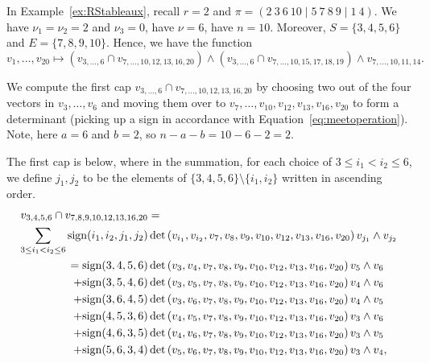 \documentclass[ALCO, Unicode]{cedram}
\numberwithin{equation}{section}
\begin{document}
\begin{example}\label{ex:cap}
In Example~\ref{ex:RStableaux}, recall $r=2$ and $\pi=(2~3~6~10 \mid 5~7~8~9 \mid 1~4)$. We have $\nu_1 = \nu_2 = 2$ and $\nu_3 = 0$, have $\nu = 6$, have $n=10$. Moreover, $S = \{3,4,5,6\}$ and $E = \{7,8,9,10\}$.
Hence, we have the function 
\[v_1,\dots,v_{20} \mapsto \left(v_{3,\dots,6} \cap v_{7,\dots,10, 12, 13, 16, 20} \right) \wedge \left(v_{3,\dots,6} \cap v_{7,\dots,10, 15, 17, 18, 19} \right) \wedge v_{7,\dots,10, 11, 14}.\]

We compute the first cap $v_{3,\dots,6} \cap v_{7,\dots,10, 12, 13, 16, 20}$ by choosing two out of the four vectors in $v_{3},\dots,v_{6}$ and moving them over to $v_7,\dots,v_{10},v_{12},v_{13},v_{16},v_{20}$ to form a determinant (picking up a sign in accordance with Equation~\eqref{eq:meetoperation}). Note, here $a=6$ and $b=2$, so $n -a-b = 10-6-2 = 2$.

The first cap is below, where in the summation, for each choice of $3 \leq i_1 < i_2 \leq 6$, we define $j_1,j_{2}$ to be the elements of $\{3,4,5,6\} \setminus \{i_1,i_2\}$ written in ascending order. 
\begin{align*}
v_{3,4,5,6} \cap v_{7,8,9,10,12,13,16,20} &= \\ \sum_{3\leq i_1 < i_2\leq 6} {\rm sign}(i_1,i_2,j_1,j_{2}) &\det\left(v_{i_1},v_{i_2}, v_{7}, v_{8}, v_{9}, v_{10},v_{12}, v_{13}, v_{16}, v_{20}\right)v_{j_1} \wedge v_{j_{2}}\nonumber \\
= {\rm sign}(3,4,5,6) &\det\left(v_{3},v_{4}, v_{7}, v_{8}, v_{9}, v_{10},v_{12}, v_{13}, v_{16}, v_{20}\right)v_{5} \wedge v_{6} \nonumber \\
+ {\rm sign}(3,5,4,6) &\det\left(v_{3},v_{5}, v_{7}, v_{8}, v_{9}, v_{10},v_{12}, v_{13}, v_{16}, v_{20}\right)v_{4} \wedge v_{6} \nonumber \\
+ {\rm sign}(3,6,4,5) &\det\left(v_{3},v_{6}, v_{7}, v_{8}, v_{9}, v_{10},v_{12}, v_{13}, v_{16}, v_{20}\right)v_{4} \wedge v_{5} \nonumber \\
+ {\rm sign}(4,5,3,6) &\det\left(v_{4},v_{5}, v_{7}, v_{8}, v_{9}, v_{10},v_{12}, v_{13}, v_{16}, v_{20}\right)v_{3} \wedge v_{6} \nonumber \\
+ {\rm sign}(4,6,3,5) &\det\left(v_{4},v_{6}, v_{7}, v_{8}, v_{9}, v_{10},v_{12}, v_{13}, v_{16}, v_{20}\right)v_{3} \wedge v_{5} \nonumber \\
+ {\rm sign}(5,6,3,4) &\det\left(v_{5},v_{6}, v_{7}, v_{8}, v_{9}, v_{10},v_{12}, v_{13}, v_{16}, v_{20}\right)v_{3} \wedge v_{4} \nonumber ,
\end{align*}



\end{example}
\end{document}
